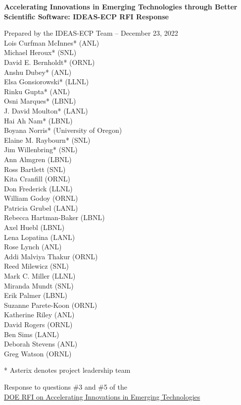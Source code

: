 \begin{center}
{\Large {\bf Accelerating Innovations in Emerging Technologies through Better Scientific Software: IDEAS-ECP RFI Response}}
\end{center}

\vspace*{1ex}
\begin{center}
    
{Prepared by the IDEAS-ECP Team -- December 23, 2022}\\

\bigskip
Lois Curfman McInnes* (ANL) \\
Michael Heroux* (SNL) \\
David E. Bernholdt* (ORNL) \\
Anshu Dubey* (ANL) \\
Elsa Gonsiorowski* (LLNL) \\
Rinku Gupta* (ANL) \\
Osni Marques* (LBNL) \\
J. David Moulton* (LANL) \\
Hai Ah Nam* (LBNL) \\
Boyana Norris* (University of Oregon) \\
Elaine M. Raybourn* (SNL) \\
Jim Willenbring* (SNL) \\
Ann Almgren (LBNL) \\
Ross Bartlett (SNL) \\
Kita Cranfill (ORNL) \\
Don Frederick (LLNL) \\
William Godoy (ORNL) \\
Patricia Grubel (LANL) \\
Rebecca Hartman-Baker (LBNL) \\
Axel Huebl (LBNL) \\
Lena Lopatina (LANL) \\
Rose Lynch (ANL) \\
Addi Malviya Thakur (ORNL) \\
Reed Milewicz (SNL) \\
Mark C. Miller (LLNL) \\
Miranda Mundt (SNL) \\
Erik Palmer (LBNL) \\
Suzanne Parete-Koon (ORNL) \\
Katherine Riley (ANL) \\
David Rogers (ORNL) \\
Ben Sims (LANL) \\
Deborah Stevens (ANL) \\
Greg Watson (ORNL)

\bigskip
* Asterix denotes project leadership team


\bigskip
Response to questions \#3 and \#5 of the\\ \href{https://www.federalregister.gov/documents/2022/11/08/2022-24250/accelerating-innovations-in-emerging-technologies}{DOE RFI on Accelerating Innovations in Emerging Technologies}
\end{center}

